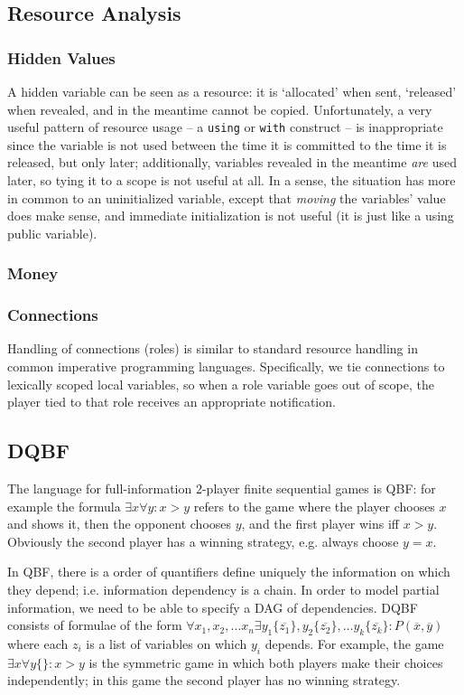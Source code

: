 \documentclass[acmsmall,review,anonymous]{acmart}\settopmatter{printfolios=true,printccs=false,printacmref=false}
\begin{document}
\subsection{Resource Analysis}
\subsubsection{Hidden Values}
A hidden variable can be seen as a resource: it is `allocated' when sent, `released' when revealed, and in the meantime cannot be copied. Unfortunately, a very useful pattern of resource usage -- a \texttt{using} or \texttt{with} construct -- is inappropriate since the variable is not used between the time it is committed to the time it is released, but only later; additionally, variables revealed in the meantime \textit{are} used later, so tying it to a scope is not useful at all. In a sense, the situation has more in common to an uninitialized variable, except that \textit{moving} the variables' value does make sense, and immediate initialization is not useful (it is just like a using public variable).

\subsubsection{Money}

\subsubsection{Connections}

Handling of connections (roles) is similar to standard resource handling in common imperative programming languages. Specifically, we tie connections to lexically scoped local variables, so when a role variable goes out of scope, the player tied to that role receives an appropriate notification.

\subsection{DQBF}
The language for full-information 2-player finite sequential games is QBF: for example the formula $\exists x \forall y: x > y$ refers to the game where the player chooses $x$ and shows it, then the opponent chooses $y$, and the first player wins iff $x > y$. Obviously the second player has a winning strategy, e.g. always choose $y=x$.

In QBF, there is a order of quantifiers define uniquely the information on which they depend; i.e. information dependency is a chain. In order to model partial information, we need to be able to specify a DAG of dependencies. DQBF consists of formulae of the form $\forall x_1, x_2, \ldots x_n \exists y_1 \{\overline{z_1}\}, y_2 \{\overline{z_2}\}, \ldots y_k \{\overline{z_k}\}: P(\overline{x}, \overline{y})$ where each $z_i$ is a list of variables on which $y_i$ depends. For example, the game $\exists x \forall y\{\}: x > y$ is the symmetric game in which both players make their choices independently; in this game the second player has no winning strategy.
\end{document}
